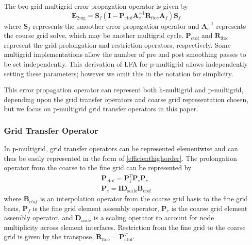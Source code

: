 \documentclass[review]{siamart190516}
\begin{document}
The two-grid multigrid error propagation operator is given by
\begin{equation}
\mathbf{E}_{\text{2mg}} = \mathbf{S}_f \left( \mathbf{I} - \mathbf{P}_{\text{ctof}} \mathbf{A}_c^{-1} \mathbf{R}_{\text{ftoc}} \mathbf{A}_f \right) \mathbf{S}_f
\end{equation}
where $\mathbf{S}_f$ represents the smoother error propagation operator and $\mathbf{A}_c^{-1}$ represents the course grid solve, which may be another multigrid cycle.
$\mathbf{P}_{\text{ctof}}$ and $\mathbf{R}_{\text{ftoc}}$ represent the grid prolongation and restriction operators, respectively.
Some multigrid implementations allow the number of pre and post smoothing passes to be set independently.
This derivation of LFA for p-multigrid allows independently setting these parameters; however we omit this in the notation for simplicity.

This error propagation operator can represent both h-multigrid and p-multigrid, depending upon the grid transfer operators and coarse grid representation chosen, but we focus on p-multigrid grid transfer operators in this paper.

\subsubsection{Grid Transfer Operator}\label{sec:grids}

In p-multigrid, grid transfer operators can be represented elementwise and can thus be easily represented in the form of \cref{efficienthighorder}.
The prolongation operator from the coarse to the fine grid can be represented by
\begin{equation}
\begin{split}
\mathbf{P}_{\text{ctof}} = \mathbf{P}_f^T \mathbf{P}_e \mathbf{P}_c\\
\mathbf{P}_e = \mathbf{I} \mathbf{D}_{\text{scale}} \mathbf{B}_{\text{ctof}}
\end{split}
\end{equation}
where $\mathbf{B}_{ctof}$ is an interpolation operator from the coarse grid basis to the fine grid basis, $\mathbf{P}_f$ is the fine grid element assembly operator, $\mathbf{P}_c$ is the coarse grid element assembly operator, and $\mathbf{D}_{\text{scale}}$ is a scaling operator to account for node multiplicity across element interfaces.
Restriction from the fine grid to the coarse grid is given by the transpose, $\mathbf{R}_{\text{ftoc}} = \mathbf{P}_{\text{ctof}}^T$.
\end{document}
